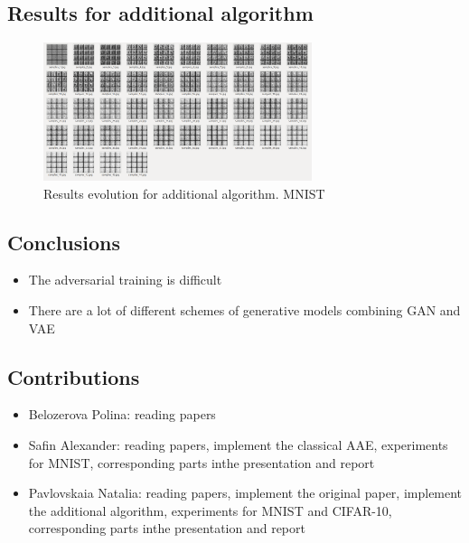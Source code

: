 \documentclass{article}
\begin{document}
    \subsection{Results for additional algorithm}
    \begin{center}
        \begin{figure}[H]
            \centering
            \includegraphics[width=0.7\textwidth]{figures/MNIST-additional-evolution.png}
            \caption{Results evolution for additional algorithm. MNIST}
        \end{figure}
    \end{center}

    \subsection{Conclusions}
    \begin{itemize}
        \item The adversarial training is difficult
        \item There are a lot of different schemes of generative models combining GAN and VAE
    \end{itemize}

    \subsection{Contributions}
    \begin{itemize}
        \item Belozerova Polina: reading papers
        \item Safin Alexander: reading papers, implement the classical AAE,
        experiments for MNIST, corresponding parts inthe presentation and report
        \item Pavlovskaia Natalia: reading papers, implement the original paper, implement the additional algorithm,
        experiments for MNIST and CIFAR-10, corresponding parts inthe presentation and report
    \end{itemize}

    
    
\end{document}
